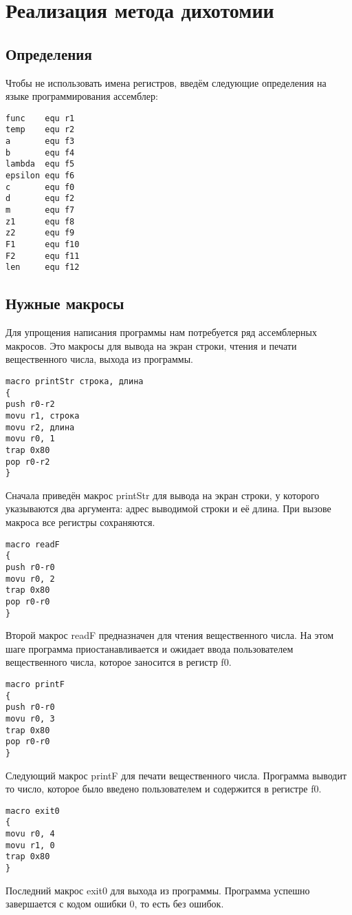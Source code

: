 \documentclass[12pt,a4paper,oneside]{report}
\begin{document}
\chapter{Реализация метода дихотомии}
\section{Определения}
Чтобы не использовать имена регистров, введём следующие определения на языке программирования ассемблер:
\begin{verbatim}
func    equ r1
temp    equ r2
a       equ f3
b       equ f4
lambda  equ f5
epsilon equ f6
c       equ f0
d       equ f2
m       equ f7
z1      equ f8
z2      equ f9
F1      equ f10
F2      equ f11
len     equ f12
\end{verbatim}

\section{Нужные макросы}
Для упрощения написания программы нам потребуется ряд ассемблерных макросов. Это макросы для вывода на экран строки, чтения и печати вещественного числа, выхода из программы.
\begin{verbatim}
macro printStr строка, длина
{
push r0-r2
movu r1, строка
movu r2, длина
movu r0, 1
trap 0x80
pop r0-r2
}
\end{verbatim}
\par
Сначала приведён макрос printStr для вывода на экран строки, у которого указываются два аргумента: адрес выводимой строки и её длина. При вызове макроса все регистры сохраняются.
\begin{verbatim}   
macro readF
{
push r0-r0
movu r0, 2
trap 0x80
pop r0-r0
}
\end{verbatim}
\par
Второй макрос readF предназначен для чтения вещественного числа. На этом шаге программа приостанавливается и ожидает ввода пользователем вещественного числа, которое заносится в регистр f0.
\begin{verbatim} 
macro printF
{
push r0-r0
movu r0, 3
trap 0x80
pop r0-r0
}
\end{verbatim}
\par
Следующий макрос printF для печати вещественного числа. Программа выводит то число, которое было введено пользователем и содержится в регистре f0.
\begin{verbatim} 
macro exit0
{
movu r0, 4
movu r1, 0
trap 0x80
}
\end{verbatim}
\par
Последний макрос exit0 для выхода из программы. Программа успешно завершается с кодом ошибки 0, то есть без ошибок.
\end{document}
